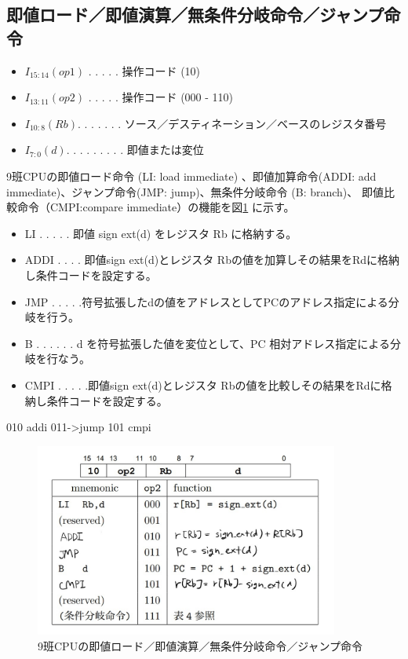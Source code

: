 \documentclass[a4paper,11pt,oneside,openany]{jsarticle}
\begin{document}
\subsection{即値ロード／即値演算／無条件分岐命令／ジャンプ命令}
\begin{itemize}
\item $I_{15:14} (op1)$ . . . . . 操作コード (10)
\item $I_{13:11} (op2)$ . . . . . 操作コード (000 - 110)
\item $I_{10:8} (Rb) $. . . . . . . ソース／デスティネーション／ベースのレジスタ番号
\item $I_{7:0} (d) $. . . . . . . . . 即値または変位
\end{itemize}
9班CPUの即値ロード命令 (LI: load immediate) 、即値加算命令(ADDI: add immediate)、ジャンプ命令(JMP: jump)、無条件分岐命令 (B: branch)、 即値比較命令（CMPI:compare immediate）の機能を図\ref{imm}
に示す。
\begin{itemize}
\item LI . . . . . 即値 sign ext(d) をレジスタ Rb に格納する。
\item ADDI . . . . 即値sign ext(d)とレジスタ Rbの値を加算しその結果をRdに格納し条件コードを設定する。
\item JMP . . . . .符号拡張したdの値をアドレスとしてPCのアドレス指定による分岐を行う。
\item B . . . . . . d を符号拡張した値を変位として、PC 相対アドレス指定による分岐を行なう。
\item CMPI . . . . .即値sign ext(d)とレジスタ Rbの値を比較しその結果をRdに格納し条件コードを設定する。
\end{itemize}
010 addi
011->jump
101 cmpi
\begin{figure}[h]
  \centering
  \includegraphics[width=10cm]{imm.jpg}
  \caption{9班CPUの即値ロード／即値演算／無条件分岐命令／ジャンプ命令}
  \label{imm}
\end{figure}
\end{document}
